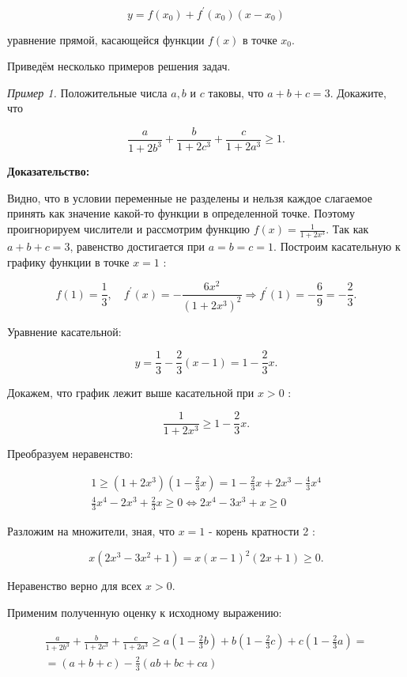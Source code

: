$$
y = f\left(x_0\right)+f^{\prime}\left(x_0\right)\left(x-x_0\right)
$$

уравнение прямой, касающейся функции $f(x)$ в точке $x_0$.

Приведём несколько примеров решения задач.

\textit{Пример 1.}
Положительные числа $a, b$ и $c$ таковы, что $a+b+c=3$. Докажите, что

$$
\frac{a}{1+2 b^3}+\frac{b}{1+2 c^3}+\frac{c}{1+2 a^3} \geqslant 1 .
$$

\textbf{Доказательство:}

Видно, что в условии переменные не разделены и нельзя каждое слагаемое принять как значение какой-то функции в определенной точке. Поэтому проигнорируем числители и рассмотрим функцию $f(x)=\frac{1}{1+2 x^3}$. Так как $a+b+c=3$, равенство достигается при $a=b=c=1$. Построим касательную к графику функции в точке $x=1$ :

$$
f(1)=\frac{1}{3}, \quad f^{\prime}(x)=-\frac{6 x^2}{\left(1+2 x^3\right)^2} \Longrightarrow f^{\prime}(1)=-\frac{6}{9}=-\frac{2}{3} .
$$


Уравнение касательной:

$$
y=\frac{1}{3}-\frac{2}{3}(x-1)=1-\frac{2}{3} x .
$$


Докажем, что график лежит выше касательной при $x>0$ :

$$
\frac{1}{1+2 x^3} \geqslant 1-\frac{2}{3} x .
$$


Преобразуем неравенство:

$$
\begin{gathered}
1 \geqslant\left(1+2 x^3\right)\left(1-\frac{2}{3} x\right)=1-\frac{2}{3} x+2 x^3-\frac{4}{3} x^4 \\
\frac{4}{3} x^4-2 x^3+\frac{2}{3} x \geqslant 0 \Longleftrightarrow 2 x^4-3 x^3+x \geqslant 0
\end{gathered}
$$


Разложим на множители, зная, что $x=1$ - корень кратности 2 :

$$
x\left(2 x^3-3 x^2+1\right)=x(x-1)^2(2 x+1) \geqslant 0 .
$$


Неравенство верно для всех $x>0$.

Применим полученную оценку к исходному выражению:

$$
\begin{gathered}
\frac{a}{1+2 b^3}+\frac{b}{1+2 c^3}+\frac{c}{1+2 a^3} \geqslant a\left(1-\frac{2}{3} b\right)+b\left(1-\frac{2}{3} c\right)+c\left(1-\frac{2}{3} a\right)= \\
=(a+b+c)-\frac{2}{3}(a b+b c+c a)
\end{gathered}
$$



